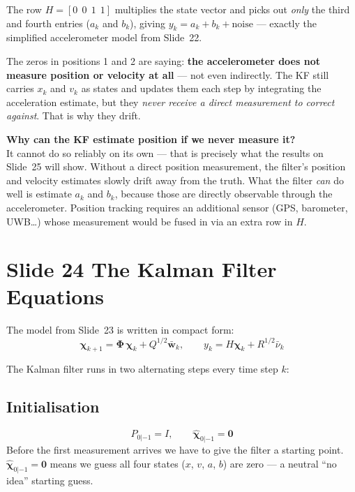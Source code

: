 \documentclass[12pt, a4paper]{article}
\begin{document}
The row $H = [0\ \ 0\ \ 1\ \ 1]$ multiplies the state vector and
picks out \emph{only} the third and fourth entries ($a_k$ and $b_k$),
giving $y_k = a_k + b_k + \text{noise}$ --- exactly the simplified
accelerometer model from Slide~22.

The zeros in positions 1 and 2 are saying:
\textbf{the accelerometer does not measure position or velocity at all}
--- not even indirectly.
The KF still carries $x_k$ and $v_k$ as states and updates them each
step by integrating the acceleration estimate, but they \emph{never
receive a direct measurement to correct against}.
That is why they drift.

\begin{notebox}
  \textbf{Why can the KF estimate position if we never measure it?}\\
  It cannot do so reliably on its own --- that is precisely what the
  results on Slide~25 will show.
  Without a direct position measurement, the filter's position and
  velocity estimates slowly drift away from the truth.
  What the filter \emph{can} do well is estimate $a_k$ and $b_k$,
  because those are directly observable through the accelerometer.
  Position tracking requires an additional sensor (GPS, barometer,
  UWB\ldots) whose measurement would be fused in via an extra row in
  $H$.
\end{notebox}

\section*{Slide 24 \quad The Kalman Filter Equations}

The model from Slide~23 is written in compact form:
\[
  \boldsymbol{\chi}_{k+1} = \boldsymbol{\Phi}\,\boldsymbol{\chi}_k
    + Q^{1/2}\bar{\mathbf{w}}_k, \qquad
  y_k = H\boldsymbol{\chi}_k + R^{1/2}\bar{\nu}_k
\]

The Kalman filter runs in two alternating steps every time step $k$:

\subsection*{Initialisation}
\[
  P_{0|-1} = I, \qquad \hat{\boldsymbol{\chi}}_{0|-1} = \mathbf{0}
\]
Before the first measurement arrives we have to give the filter a
starting point.
$\hat{\boldsymbol{\chi}}_{0|-1} = \mathbf{0}$ means we guess all
four states ($x$, $v$, $a$, $b$) are zero --- a neutral ``no idea''
starting guess.
\end{document}
